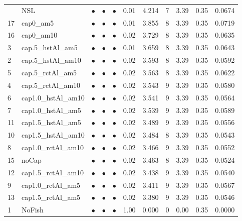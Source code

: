 \documentclass[11pt]{book}
\begin{document}
\begin{landscape}
\begin{longtable}[t]{llccccccccc}
\midrule
\endhead
\
\endfoot
\bottomrule
\endlastfoot
14 & NSL & $\bullet$ & $\bullet$ & $\bullet$ & 0.01 & 4.214 & 7 & 3.39 & 0.35 & 0.0674\\
17 & cap0\_am5 & $\bullet$ & $\bullet$ & $\bullet$ & 0.01 & 3.855 & 8 & 3.39 & 0.35 & 0.0719\\
16 & cap0\_am10 & $\bullet$ & $\bullet$ & $\bullet$ & 0.02 & 3.729 & 8 & 3.39 & 0.35 & 0.0635\\
3 & cap.5\_hstAl\_am5 & $\bullet$ & $\bullet$ & $\bullet$ & 0.01 & 3.659 & 8 & 3.39 & 0.35 & 0.0643\\
2 & cap.5\_hstAl\_am10 & $\bullet$ & $\bullet$ & $\bullet$ & 0.02 & 3.593 & 8 & 3.39 & 0.35 & 0.0592\\
5 & cap.5\_rctAl\_am5 & $\bullet$ & $\bullet$ & $\bullet$ & 0.02 & 3.563 & 8 & 3.39 & 0.35 & 0.0622\\
4 & cap.5\_rctAl\_am10 & $\bullet$ & $\bullet$ & $\bullet$ & 0.02 & 3.543 & 9 & 3.39 & 0.35 & 0.0580\\
6 & cap1.0\_hstAl\_am10 & $\bullet$ & $\bullet$ & $\bullet$ & 0.02 & 3.541 & 9 & 3.39 & 0.35 & 0.0564\\
7 & cap1.0\_hstAl\_am5 & $\bullet$ & $\bullet$ & $\bullet$ & 0.02 & 3.539 & 9 & 3.39 & 0.35 & 0.0589\\
11 & cap1.5\_hstAl\_am5 & $\bullet$ & $\bullet$ & $\bullet$ & 0.02 & 3.489 & 9 & 3.39 & 0.35 & 0.0556\\
10 & cap1.5\_hstAl\_am10 & $\bullet$ & $\bullet$ & $\bullet$ & 0.02 & 3.484 & 8 & 3.39 & 0.35 & 0.0543\\
8 & cap1.0\_rctAl\_am10 & $\bullet$ & $\bullet$ & $\bullet$ & 0.02 & 3.466 & 9 & 3.39 & 0.35 & 0.0552\\
15 & noCap & $\bullet$ & $\bullet$ & $\bullet$ & 0.02 & 3.463 & 8 & 3.39 & 0.35 & 0.0524\\
12 & cap1.5\_rctAl\_am10 & $\bullet$ & $\bullet$ & $\bullet$ & 0.02 & 3.438 & 9 & 3.39 & 0.35 & 0.0540\\
9 & cap1.0\_rctAl\_am5 & $\bullet$ & $\bullet$ & $\bullet$ & 0.02 & 3.411 & 9 & 3.39 & 0.35 & 0.0567\\
13 & cap1.5\_rctAl\_am5 & $\bullet$ & $\bullet$ & $\bullet$ & 0.02 & 3.380 & 9 & 3.39 & 0.35 & 0.0546\\
1 & NoFish & $\bullet$ & $\bullet$ & $\bullet$ & 1.00 & 0.000 & 0 & 0.00 & 0.35 & 0.0000\\*
\end{longtable}
\end{landscape}
\endgroup{}
\end{document}
